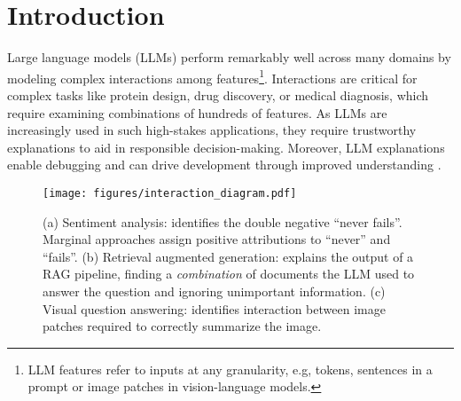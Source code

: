 \section{Introduction}
\label{sec:intro}
Large language models (LLMs) perform remarkably well across many domains by modeling complex interactions among features\footnote{LLM features refer to inputs at any granularity, e.g, tokens, sentences in a prompt or image patches in vision-language models.}. 
%
Interactions are critical for complex tasks like protein design, drug discovery, or medical diagnosis, which require examining combinations of hundreds of features. 
%
As LLMs are increasingly used in such high-stakes applications, they require trustworthy explanations to aid in responsible decision-making.
%
Moreover, LLM explanations enable debugging and can drive development through improved understanding \cite{zhang2023tell}. 
\begin{figure*}[t!]
    \centering
\texttt{[image: figures/interaction\_diagram.pdf]}
    \caption{
    (a) Sentiment analysis: \SpecExp{} identifies the double negative ``never fails''. Marginal approaches assign positive attributions to ``never'' and ``fails''. 
    (b) Retrieval augmented generation: \SpecExp{} explains the output of a RAG pipeline, finding a \textit{combination} of documents the LLM used to answer the question and ignoring unimportant information.
    (c) Visual question answering: \SpecExp{} identifies interaction between image patches required to correctly summarize the image.} 
        \label{fig:cc-intro}
\end{figure*}

